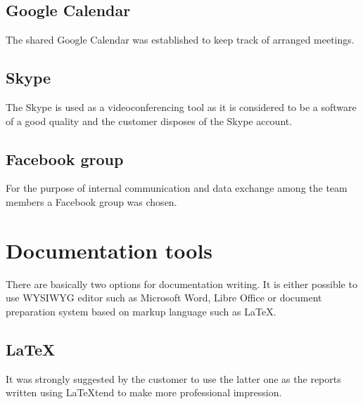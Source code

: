 
\subsection{Google Calendar}
The shared Google Calendar was established to keep track of arranged meetings.


\subsection{Skype}
The Skype is used as a videoconferencing tool as it is considered to be a software of a good quality and the customer disposes of the Skype account.


\subsection{Facebook group}
For the purpose of internal communication and data exchange among the team members a Facebook group was chosen.


\section{Documentation tools} 
\label{sec:documentation_tools}

There are basically two options for documentation writing. It is either possible to use WYSIWYG editor such as Microsoft Word, Libre Office or document preparation system based on markup language such as \LaTeX.

\subsection{\LaTeX}

It was strongly suggested by the customer to use the latter one as the reports written using \LaTeX  tend to make more professional impression.


